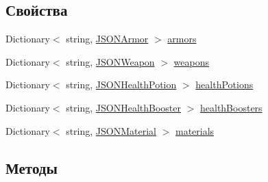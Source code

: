 \subsection*{Свойства}
\begin{DoxyCompactItemize}
\item 
Dictionary$<$ string, \hyperlink{class_a_s_c_i_i_wars_1_1_game_1_1_j_s_o_n_armor}{J\+S\+O\+N\+Armor} $>$ \hyperlink{class_a_s_c_i_i_wars_1_1_game_1_1_item_container_ac7163583c5b161a5621b1d8c8eecb628}{armors}
\item 
Dictionary$<$ string, \hyperlink{class_a_s_c_i_i_wars_1_1_game_1_1_j_s_o_n_weapon}{J\+S\+O\+N\+Weapon} $>$ \hyperlink{class_a_s_c_i_i_wars_1_1_game_1_1_item_container_aaa8cd3f87c9f17712bca4ea090166ce7}{weapons}
\item 
Dictionary$<$ string, \hyperlink{class_a_s_c_i_i_wars_1_1_game_1_1_j_s_o_n_health_potion}{J\+S\+O\+N\+Health\+Potion} $>$ \hyperlink{class_a_s_c_i_i_wars_1_1_game_1_1_item_container_a84c795ebe8785d1d14dad75b7670f68a}{health\+Potions}
\item 
Dictionary$<$ string, \hyperlink{class_a_s_c_i_i_wars_1_1_game_1_1_j_s_o_n_health_booster}{J\+S\+O\+N\+Health\+Booster} $>$ \hyperlink{class_a_s_c_i_i_wars_1_1_game_1_1_item_container_aaecb48567ec96981ee40734e45f3339b}{health\+Boosters}
\item 
Dictionary$<$ string, \hyperlink{class_a_s_c_i_i_wars_1_1_game_1_1_j_s_o_n_material}{J\+S\+O\+N\+Material} $>$ \hyperlink{class_a_s_c_i_i_wars_1_1_game_1_1_item_container_a503bd6d21fce823b843969ccf07871bd}{materials}
\end{DoxyCompactItemize}


\subsection{Методы}
\hypertarget{class_a_s_c_i_i_wars_1_1_game_1_1_item_container_a4aa8a9dc347ac6b8b24486567110c802}{}\label{class_a_s_c_i_i_wars_1_1_game_1_1_item_container_a4aa8a9dc347ac6b8b24486567110c802} 
